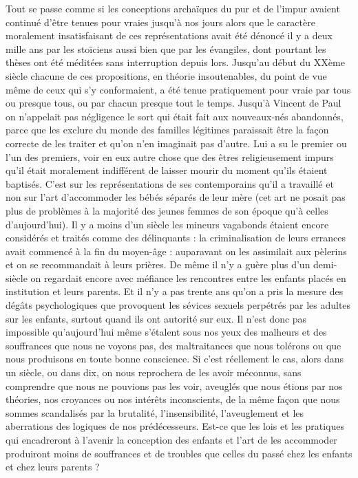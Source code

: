  Tout se passe comme si les conceptions archaïques du pur et de l'impur avaient continué d'être tenues pour vraies jusqu'à nos jours alors que le caractère moralement insatisfaisant de ces représentations avait été dénoncé il y a deux mille ans par les stoïciens aussi bien que par les évangiles, dont pourtant les thèses ont été méditées sans interruption depuis lors. Jusqu'au début du XXème siècle chacune de ces propositions, en théorie insoutenables, du point de vue même de ceux qui s'y conformaient, a été tenue pratiquement pour vraie par tous ou presque tous, ou par chacun presque tout le temps. Jusqu'à Vincent de Paul on n'appelait pas négligence le sort qui était fait aux nouveaux-nés abandonnés, parce que les exclure du monde des familles légitimes paraissait être la façon correcte de les traiter et qu'on n'en imaginait pas d'autre. Lui a su le premier ou l'un des premiers, voir en eux autre chose que des êtres religieusement impurs qu'il était moralement indifférent de laisser mourir du moment qu'ils étaient baptisés. C'est sur les représentations de ses contemporains qu'il a travaillé et non sur l'art d'accommoder les bébés séparés de leur mère (cet art ne posait pas plus de problèmes à la majorité des jeunes femmes de son époque qu'à celles d'aujourd'hui). 
 Il y a moins d'un siècle les mineurs vagabonds étaient encore considérés et traités comme des délinquants : la criminalisation de leurs errances avait commencé à la fin du moyen-âge : auparavant on les assimilait aux pèlerins et on se recommandait à leurs prières. 
 De même il n'y a guère plus d'un demi-siècle on regardait encore avec méfiance les rencontres entre les enfants placés en institution et leurs parents. 
 Et il n'y a pas trente ans qu'on a pris la mesure des dégâts psychologiques que provoquent les sévices sexuels perpétrés par les adultes sur les enfants, surtout quand ils ont autorité sur eux. 
 Il n'est donc pas impossible qu'aujourd'hui même s'étalent sous nos yeux des malheurs et des souffrances que nous ne voyons pas, des maltraitances que nous tolérons ou que nous produisons en toute bonne conscience. Si c'est réellement le cas, alors dans un siècle, ou dans dix, on nous reprochera de les avoir méconnus, sans comprendre que nous ne pouvions pas les voir, aveuglés que nous étions par nos théories, nos croyances ou nos intérêts inconscients, de la même façon que nous sommes scandalisés par la brutalité, l'insensibilité, l'aveuglement et les aberrations des logiques de nos prédécesseurs. 
 Est-ce que les lois et les pratiques qui encadreront à l'avenir la conception des enfants et l'art de les accommoder produiront moins de souffrances et de troubles que celles du passé chez les enfants et chez leurs parents ?
